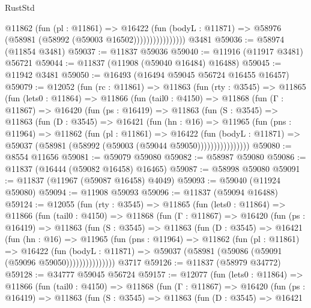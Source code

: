 \begin{lexlean}{RustStd}
\begin{coremodule}
{\begin{coremodule}
{{{{{{{{{{{{{{{{{{{{{{{{{{{{{{{{{{{{{{{{{{{{{{{{{{                        @11862
                          (fun (pl : @11861) =>
                          @16422
                            (fun (bodyL : @11871) =>
                            @58976 (@58981 (@58992 (@59003 @16502))))))))))))))))
    @3481
@59036 := @58974 (@11854 @3481)
@59037 := @11837 @59036
@59040 := @11916 (@11917 @3481) @56721
@59044 := @11837 (@11908 (@59040 @16484) @16488)
@59045 := @11942 @3481
@59050 := @16493 (@16494 @59045 @56724 @16455 @16457)
@59079 := @12052
    (fun (rc : @11861) =>
    @11863
      (fun (rty : @3545) =>
      @11865
        (fun (lets0 : @11864) =>
        @11866
          (fun (tail0 : @4150) =>
          @11868
            (fun (Γ : @11867) =>
            @16420
              (fun (ps : @16419) =>
              @11863
                (fun (S : @3545) =>
                @11863
                  (fun (D : @3545) =>
                  @16421
                    (fun (hn : @16) =>
                    @11965
                      (fun (pns : @11964) =>
                      @11862
                        (fun (pl : @11861) =>
                        @16422
                          (fun (bodyL : @11871) =>
                          @59037 (@58981 (@58992 (@59003 (@59044 @59050))))))))))))))))
@59080 := @8554 @11656
@59081 := @59079 @59080
@59082 := @58987 @59080
@59086 := @11837 (@16444 (@59082 @16458) @16465)
@59087 := @58998 @59080
@59091 := @11837 (@11967 (@59087 @16458) @4049)
@59093 := @59040 (@11924 @59080)
@59094 := @11908 @59093
@59096 := @11837 (@59094 @16488)
@59124 := @12055
    (fun (rty : @3545) =>
    @11865
      (fun (lets0 : @11864) =>
      @11866
        (fun (tail0 : @4150) =>
        @11868
          (fun (Γ : @11867) =>
          @16420
            (fun (ps : @16419) =>
            @11863
              (fun (S : @3545) =>
              @11863
                (fun (D : @3545) =>
                @16421
                  (fun (hn : @16) =>
                  @11965
                    (fun (pns : @11964) =>
                    @11862
                      (fun (pl : @11861) =>
                      @16422
                        (fun (bodyL : @11871) =>
                        @59037 (@58981 (@59086 (@59091 (@59096 @59050)))))))))))))))
    @3717
@59126 := @11837 (@58979 @34772)
@59128 := @34777 @59045 @56724
@59157 := @12077
    (fun (lets0 : @11864) =>
    @11866
      (fun (tail0 : @4150) =>
      @11868
        (fun (Γ : @11867) =>
        @16420
          (fun (ps : @16419) =>
          @11863
            (fun (S : @3545) =>
            @11863
              (fun (D : @3545) =>
              @16421
}}}}}}}}}}}}}}}}}}}}}}}}}}}}}}}}}}}}}}}}}}}}}}}}}}
\end{coremodule}}
\end{coremodule}
\end{lexlean}
